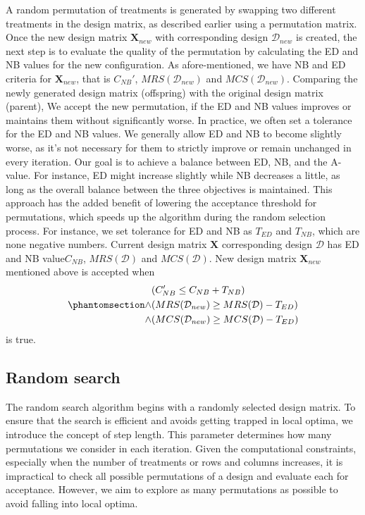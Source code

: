 \documentclass[
  a4paper,
  oneside,
  openany,
  12pt,
  onecolumn]{book}
\theoremstyle{definition}
\theoremstyle{plain}
\theoremstyle{remark}
\begin{document}
A random permutation of treatments is generated by swapping two
different treatments in the design matrix, as described earlier using a
permutation matrix. Once the new design matrix \(\boldsymbol{X}_{new}\)
with corresponding design \(\mathcal{D}_{new}\) is created, the next
step is to evaluate the quality of the permutation by calculating the ED
and NB values for the new configuration. As afore-mentioned, we have NB
and ED criteria for \(\boldsymbol{X}_{new}\), that is \(C_{NB}'\),
\(MRS(\mathcal{D}_{new})\) and \(MCS(\mathcal{D}_{new})\). Comparing the
newly generated design matrix (offspring) with the original design
matrix (parent), We accept the new permutation, if the ED and NB values
improves or maintains them without significantly worse. In practice, we
often set a tolerance for the ED and NB values. We generally allow ED
and NB to become slightly worse, as it's not necessary for them to
strictly improve or remain unchanged in every iteration. Our goal is to
achieve a balance between ED, NB, and the A-value. For instance, ED
might increase slightly while NB decreases a little, as long as the
overall balance between the three objectives is maintained. This
approach has the added benefit of lowering the acceptance threshold for
permutations, which speeds up the algorithm during the random selection
process. For instance, we set tolerance for ED and NB as \(T_{ED}\) and
\(T_{NB}\), which are none negative numbers. Current design matrix
\(\boldsymbol{X}\) corresponding design \(\mathcal{D}\) has ED and NB
value\(C_{NB}\), \(MRS(\mathcal{D})\) and \(MCS(\mathcal{D})\). New
design matrix \(\boldsymbol{X}_{new}\) mentioned above is accepted when
\begin{equation}\phantomsection\label{eq-accp}{\begin{aligned}
&(C_{NB}'\leq C_{NB}+T_{NB}) \\
\land & (MRS(\mathcal{D}_{new})\geq MRS(\mathcal{D})-T_{ED})\\
\land & (MCS(\mathcal{D}_{new})\geq MCS(\mathcal{D})-T_{ED})
\end{aligned}}\end{equation} is true.

\subsection{Random search}\label{random-search}

The random search algorithm begins with a randomly selected design
matrix. To ensure that the search is efficient and avoids getting
trapped in local optima, we introduce the concept of step length. This
parameter determines how many permutations we consider in each
iteration. Given the computational constraints, especially when the
number of treatments or rows and columns increases, it is impractical to
check all possible permutations of a design and evaluate each for
acceptance. However, we aim to explore as many permutations as possible
to avoid falling into local optima.
\end{document}

